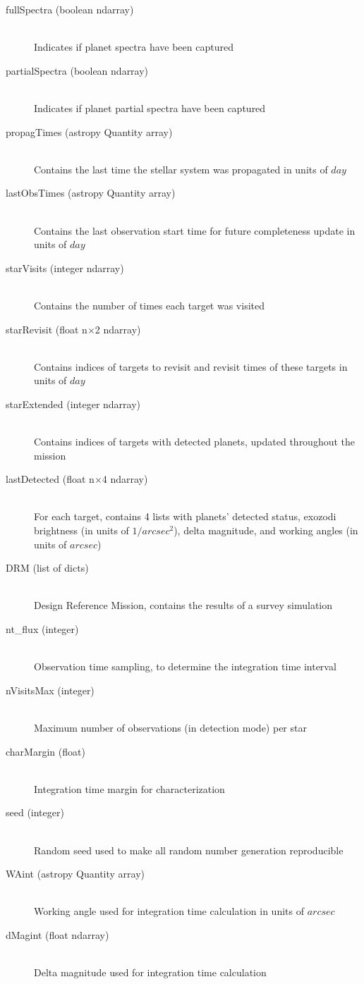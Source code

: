 \documentclass[cleanfoot]{asme2ej}
\begin{document}
\begin{itemize}
\begin{description}
    \item[fullSpectra (boolean ndarray)] \hfill \\ Indicates if planet spectra have been captured
    \item[partialSpectra (boolean ndarray)] \hfill \\ Indicates if planet partial spectra have been captured
    \item[propagTimes (astropy Quantity array)] \hfill \\ Contains the last time the stellar system was propagated in units of $day$
    \item[lastObsTimes (astropy Quantity array)] \hfill \\ Contains the last observation start time for future completeness update in units of $day$
    \item[starVisits (integer ndarray)] \hfill \\ Contains the number of times each target was visited
    \item[starRevisit (float n$\times$2 ndarray)] \hfill \\ Contains indices of targets to revisit and revisit times of these targets in units of $day$
    \item[starExtended (integer ndarray)] \hfill \\ Contains indices of targets with detected planets, updated throughout the mission
    \item[lastDetected (float n$\times$4 ndarray)] \hfill \\ For each target, contains 4 lists with planets' detected status, exozodi brightness (in units of $1/arcsec^2$), delta magnitude, and working angles (in units of $arcsec$)
    \item[DRM (list of dicts)] \hfill \\ Design Reference Mission, contains the results of a survey simulation
    \item[nt\_flux (integer)] \hfill \\ Observation time sampling, to determine the integration time interval
    \item[nVisitsMax (integer)] \hfill \\ Maximum number of observations (in detection mode) per star
    \item[charMargin (float)] \hfill \\ Integration time margin for characterization
    \item[seed (integer)] \hfill \\ Random seed used to make all random number generation reproducible
    \item[WAint (astropy Quantity array)] \hfill \\ Working angle used for integration time calculation in units of $arcsec$
    \item[dMagint (float ndarray)] \hfill \\ Delta magnitude used for integration time calculation
\end{description}
\end{itemize}
\end{document}
